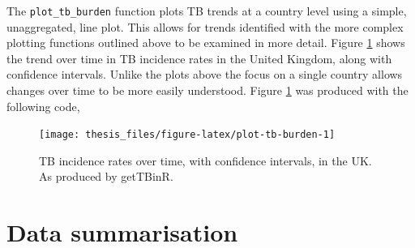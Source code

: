 \documentclass[11pt,twoside]{bristolthesis}
\begin{document}
  The \texttt{plot\_tb\_burden} function plots TB trends at a country level using a simple, unaggregated, line plot. This allows for trends identified with the more complex plotting functions outlined above to be examined in more detail. Figure \ref{fig:plot-tb-burden} shows the trend over time in TB incidence rates in the United Kingdom, along with confidence intervals. Unlike the plots above the focus on a single country allows changes over time to be more easily understood. Figure \ref{fig:plot-tb-burden} was produced with the following code,
  \begin{Shaded}
  \begin{Highlighting}[]
  \NormalTok{(} \NormalTok{,}
                  \NormalTok{,}
                  \NormalTok{) }\OperatorTok{+}
  \StringTok{  }\NormalTok{(} \NormalTok{(} \NormalTok{))}
  \end{Highlighting}
  \end{Shaded}
  \begin{figure}
  
  {\centering \texttt{[image: thesis\_files/figure-latex/plot-tb-burden-1]} 
  
  }
  
  \caption[TB incidence rates over time, with confidence intervals, in the UK. As produced by getTBinR.]{TB incidence rates over time, with confidence intervals, in the UK. As produced by getTBinR.}\label{fig:plot-tb-burden}
  \end{figure}
  \hypertarget{gettbinr-sum}{%
  \section{Data summarisation}\label{gettbinr-sum}}
  
\end{document}
